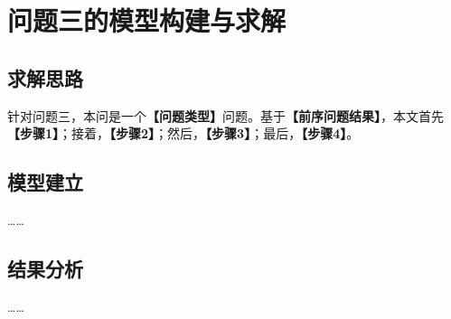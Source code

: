 
\section{问题三的模型构建与求解}

\subsection{求解思路}

针对问题三，本问是一个\textbf{【问题类型】}问题。基于\textbf{【前序问题结果】}，本文首先\textbf{【步骤1】}；接着，\textbf{【步骤2】}；然后，\textbf{【步骤3】}；最后，\textbf{【步骤4】}。

\subsection{模型建立}

……

\subsection{结果分析}

……
